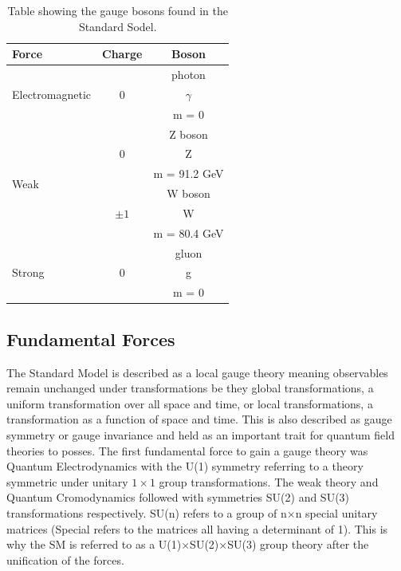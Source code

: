     \begin {table}[h]
      \begin{center}
      \begin{tabular}{|l|c|c|}
         \hline
         Force & Charge & Boson \\
         \hline
         \multirow{3}{*}{Electromagnetic} & \multirow{3}{*}{\Large 0} & photon \\
         & & {\Huge $\gamma$} \\
         & & m = 0 \\
         \hline
         \multirow{6}{*}{Weak} & \multirow{3}{*}{\Large 0} & Z boson \\
         & & {\Huge Z} \\
         & & m = 91.2 GeV \\
         \cline{2-3}
         & \multirow{3}{*}{\Large $\pm1$} & W boson \\
         & & {\Huge W} \\
         & & m = 80.4 GeV \\
         \hline
         \multirow{3}{*}{Strong} & \multirow{3}{*}{\Large 0} & gluon \\
         & & {\Huge g} \\
         & & m = 0 \\
         \hline
      \end{tabular}
      \caption{Table showing the gauge bosons found in the Standard Sodel.}
      \label{tab:bosons}
      \end{center}
    \end {table}



    \subsection{Fundamental Forces}
    The Standard Model is described as a local gauge theory meaning observables remain unchanged under transformations be they global transformations, a uniform transformation over all space and time, or local transformations, a transformation as a function of space and time. This is also described as gauge symmetry or gauge invariance and held as an important trait for quantum field theories to posses. The first fundamental force to gain a gauge theory was Quantum Electrodynamics with the U(1) symmetry referring to a theory symmetric under unitary $1\times1$ group transformations. The weak theory and Quantum Cromodynamics followed with symmetries SU(2) and SU(3) transformations respectively. SU(n) refers to a group of n$\times$n special unitary matrices (Special refers to the matrices all having a determinant of 1). This is why the SM is referred to as a U(1)$\times$SU(2)$\times$SU(3) group theory after the unification of the forces.


